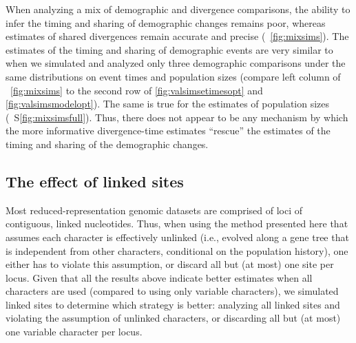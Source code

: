 When analyzing a mix of demographic and divergence comparisons, the ability to
infer the timing and sharing of demographic changes remains poor, whereas
estimates of shared divergences remain accurate and precise
(\fig{}~\ref{fig:mixsims}).
The estimates of the timing and sharing of demographic events are very similar
to when we simulated and analyzed only three demographic comparisons under the
same distributions on event times and population sizes
(compare left column of \fig{}~\ref{fig:mixsims}
to the second row of \figs
\ref{fig:valsimsetimesopt}
and
\ref{fig:valsimsmodelopt}).
The same is true for the estimates of population sizes
(\fig{}~S\ref{fig:mixsimsfull}).
Thus, there does not appear to be any mechanism by which the more informative
divergence-time estimates ``rescue'' the estimates of the timing and sharing of
the demographic changes.

\ifembed{

}{}


\subsection{The effect of linked sites}

Most reduced-representation genomic datasets are comprised of loci of
contiguous, linked nucleotides.
Thus, when using the method presented here that assumes each character is
effectively unlinked (i.e., evolved along a gene tree that is independent from
other characters, conditional on the population history), one either has to
violate this assumption, or discard all but (at most) one site per locus.
Given that all the results above indicate better estimates when all
characters are used (compared to using only variable characters), we
simulated linked sites to determine which strategy is better:
analyzing all linked sites and violating the assumption of unlinked characters,
or discarding all but (at most) one variable character per locus.

